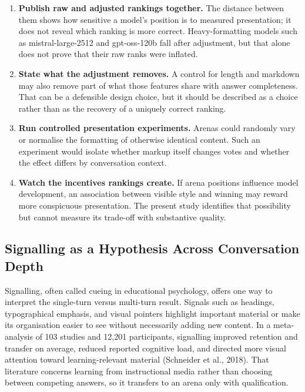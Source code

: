 \documentclass[
]{article}
\begin{document}
\begin{enumerate}
\def\labelenumi{\arabic{enumi}.}
\item
  \textbf{Publish raw and adjusted rankings together.} The distance
  between them shows how sensitive a model's position is to measured
  presentation; it does not reveal which ranking is more correct.
  Heavy-formatting models such as mistral-large-2512 and gpt-oss-120b
  fall after adjustment, but that alone does not prove that their raw
  ranks were inflated.
\item
  \textbf{State what the adjustment removes.} A control for length and
  markdown may also remove part of what those features share with answer
  completeness. That can be a defensible design choice, but it should be
  described as a choice rather than as the recovery of a uniquely
  correct ranking.
\item
  \textbf{Run controlled presentation experiments.} Arenas could
  randomly vary or normalise the formatting of otherwise identical
  content. Such an experiment would isolate whether markup itself
  changes votes and whether the effect differs by conversation context.
\item
  \textbf{Watch the incentives rankings create.} If arena positions
  influence model development, an association between visible style and
  winning may reward more conspicuous presentation. The present study
  identifies that possibility but cannot measure its trade-off with
  substantive quality.
\end{enumerate}

\subsection{Signalling as a Hypothesis Across Conversation
Depth}\label{signaling-perspective}

Signalling, often called cueing in educational psychology, offers one
way to interpret the single-turn versus multi-turn result. Signals such as headings, typographical emphasis, and visual
pointers highlight important material or make its organisation easier
to see without necessarily adding new content. In a meta-analysis of 103
studies and 12,201 participants, signalling improved retention and
transfer on average, reduced reported cognitive load, and directed more
visual attention toward learning-relevant material (Schneider et al.,
2018). That literature concerns learning from instructional media rather than
choosing between competing answers, so it transfers to an arena only
with qualification.
\end{document}
